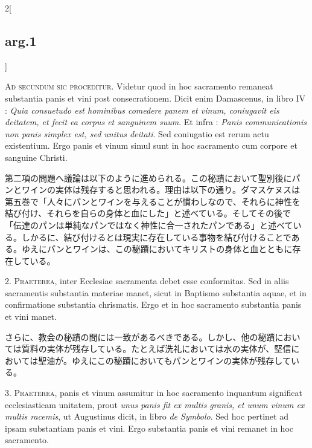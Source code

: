 \documentclass[paper=a4paper,fontsize=10pt,jafontsize=9pt,titlepage]{jlreq}
\begin{document}
\begin{paracol}{2}[\subsection{arg.1}]

{\scshape Ad secundum sic proceditur}. Videtur quod in hoc sacramento
remaneat substantia panis et vini post consecrationem. Dicit enim
Damascenus, in libro IV : {\itshape Quia consuetudo est hominibus
comedere panem et vinum, coniugavit eis deitatem, et fecit ea corpus
et sanguinem suum}. Et infra : {\itshape Panis communicationis non
panis simplex est, sed unitus deitati}. Sed coniugatio est rerum actu
existentium. Ergo panis et vinum simul sunt in hoc sacramento cum
corpore et sanguine Christi.

\switchcolumn

第二項の問題へ議論は以下のように進められる。この秘蹟において聖別後にパ
ンとワインの実体は残存すると思われる。理由は以下の通り。ダマスケヌスは
第五巻で「人々にパンとワインを与えることが慣わしなので、それらに神性を
結び付け、それらを自らの身体と血にした」と述べている。そしてその後で
「伝達のパンは単純なパンではなく神性に合一されたパンである」と述べてい
る。しかるに、結び付けるとは現実に存在している事物を結び付けることであ
る。ゆえにパンとワインは、この秘蹟においてキリストの身体と血とともに存
在している。


2. {\scshape Praeterea}, inter Ecclesiae sacramenta debet esse
conformitas. Sed in aliis sacramentis substantia materiae manet, sicut
in Baptismo substantia aquae, et in confirmatione substantia
chrismatis. Ergo et in hoc sacramento substantia panis et vini manet.

\switchcolumn

さらに、教会の秘蹟の間には一致があるべきである。しかし、他の秘蹟におい
ては質料の実体が残存している。たとえば洗礼においては水の実体が、堅信に
おいては聖油が。ゆえにこの秘蹟においてもパンとワインの実体が残存してい
る。


3. {\scshape Praeterea}, panis et vinum assumitur in hoc sacramento
inquantum significat ecclesiasticam unitatem, prout {\itshape unus
panis fit ex multis granis, et unum vinum ex multis racemis}, ut
Augustinus dicit, in libro {\itshape de Symbolo}. Sed hoc pertinet ad
ipsam substantiam panis et vini. Ergo substantia panis et vini remanet
in hoc sacramento.


\end{paracol}
\end{document}
